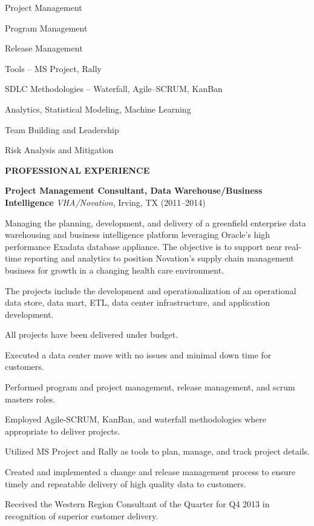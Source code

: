 \documentclass{article}
\newcommand{\sbt}{\,\begin{picture}(-1,1)(-1,-3)\circle*{3}\end{picture}\ }
\newenvironment{tightcenter}{%
  \setlength\topsep{0pt}
  \setlength\parskip{10pt}
  \begin{center}
}{%
  \end{center}
}
\begin{document}
\begin{minipage}[t]{0.4\textwidth}
\begin{compactitem}
\item[\sbt] Project Management
\item[\sbt] Program Management
\item[\sbt] Release Management
\item[\sbt] Tools -- MS Project, Rally
\end{compactitem}
\end{minipage}
\begin{minipage}[t]{0.6\textwidth}
\begin{compactitem}
\item[\sbt] SDLC Methodologies -- Waterfall, Agile--SCRUM, KanBan
\item[\sbt] Analytics, Statistical Modeling, Machine Learning
\item[\sbt] Team Building and Leadership
\item[\sbt] Risk Analysis and Mitigation
\end{compactitem}
\end{minipage}

\begin{tightcenter}
{\bfseries \large PROFESSIONAL EXPERIENCE}
\end{tightcenter}

\noindent
{\bfseries Project Management Consultant, Data Warehouse/Business Intelligence} {\itshape VHA/Novation}, Irving, TX (2011--2014)
\begin{compactitem}
\item[\sbt] Managing the planning, development, and delivery of a greenfield enterprise data warehousing and business intelligence platform leveraging Oracle's high performance Exadata database appliance. The objective is to support near real-time reporting and analytics to position Novation's supply chain management business for growth in a changing health care environment.
\item[\sbt] The projects include the development and operationalization of an operational data store, data mart, ETL, data center infrastructure, and application development.
\item[\sbt] All projects have been delivered under budget.
\item[\sbt] Executed a data center move with no issues and minimal down time for customers.
\item[\sbt] Performed program and project management, release management, and scrum masters roles.
\item[\sbt] Employed Agile-SCRUM, KanBan, and waterfall methodologies where appropriate to deliver projects.
\item[\sbt] Utilized MS Project and Rally as tools to plan, manage, and track project details.
\item[\sbt] Created and implemented a change and release management process to ensure timely and repeatable delivery of high quality data to customers.
\item[\sbt] Received the Western Region Consultant of the Quarter for Q4 2013 in recognition of superior customer delivery.
\end{compactitem}
\end{document}

